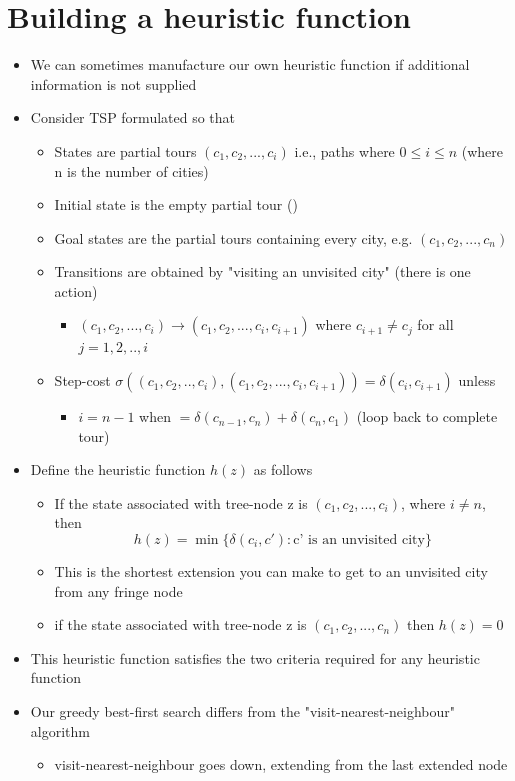 \documentclass{article}[18pt]
\begin{document}
\section{Building a heuristic function}
\begin{itemize}
	\item We can sometimes manufacture our own heuristic function if additional information is not supplied
	\item Consider TSP formulated so that
	\begin{itemize}
		\item States are partial tours $(c_1,c_2,...,c_i)$ i.e., paths where $0\leqslant i\leqslant n$ (where n is the number of cities)
		\item Initial state is the empty partial tour ()
		\item Goal states are the partial tours containing every city, e.g. $(c_1,c_2,...,c_n)$
		\item Transitions are obtained by "visiting an unvisited city" (there is one action)
		\begin{itemize}
			\item $(c_1,c_2,...,c_i)\rightarrow (c_1,c_2,...,c_i,c_{i+1})$ where $c_{i+1}\neq c_j$ for all $j=1,2,..,i$
		\end{itemize}
		\item Step-cost $\sigma((c_1,c_2,..,c_i),(c_1,c_2,...,c_i,c_{i+1}))=\delta(c_i,c_{i+1})$ unless
		\begin{itemize}
			\item $i=n-1$ when $=\delta(c_{n-1},c_n)+\delta(c_n,c_1)$ (loop back to complete tour)
		\end{itemize}
	\end{itemize}
	\item Define the heuristic function $h(z)$ as follows
	\begin{itemize}
		\item If the state associated with tree-node z is $(c_1,c_2,...,c_i)$, where $i\neq n$, then
		$$h(z)=\min\{\delta(c_i,c'): \text{c' is an unvisited city}\}$$
		\item This is the shortest extension you can make to get to an unvisited city from any fringe node
		\item if the state associated with tree-node z is $(c_1,c_2,...,c_n)$ then $h(z)=0$
	\end{itemize}
	\item This heuristic function satisfies the two criteria required for any heuristic function
	\item Our greedy best-first search differs from the "visit-nearest-neighbour" algorithm
	\begin{itemize}
		\item visit-nearest-neighbour goes down, extending from the last extended node
	\end{itemize}
\end{itemize}
\end{document}
